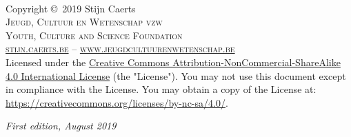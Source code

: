 \documentclass[11pt,fleqn]{book} %
\begin{document}

\begingroup
\thispagestyle{empty} %
\vfill
\endgroup


\newpage
~\vfill
\thispagestyle{empty}
{
\selectfont

\noindent Copyright \copyright\ 2019 Stijn Caerts\\ %

\noindent \textsc{Jeugd, Cultuur en Wetenschap vzw}\\ %
\noindent \textsc{Youth, Culture and Science Foundation}\\ %

\noindent \textsc{\href{https://stijn.caerts.be/}{stijn.caerts.be}} -- \textsc{\href{https://www.jeugdcultuurenwetenschap.be/}{www.jeugdcultuurenwetenschap.be}}\\ %

\noindent Licensed under the \href{https://creativecommons.org/licenses/by-nc-sa/4.0/deed.en}{Creative Commons Attribution-NonCommercial-ShareAlike 4.0 International License} (the "License"). You may not use this document except in compliance with the License. You may obtain a copy of the License at:\\
\url{https://creativecommons.org/licenses/by-nc-sa/4.0/}.\\

\noindent \href{https://creativecommons.org/licenses/by-nc-sa/4.0/}{\ccbyncsaeu}

\vspace{1cm}

\noindent \textit{First edition, August 2019} %
}
\end{document}
